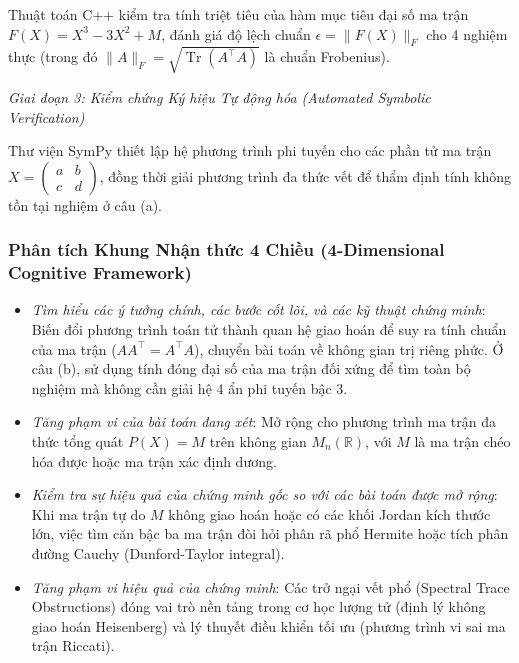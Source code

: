\documentclass{article}
\begin{document}
Thuật toán C++ kiểm tra tính triệt tiêu của hàm mục tiêu đại số ma trận $F(X) = X^3 - 3X^2 + M$, đánh giá độ lệch chuẩn $\epsilon = \|F(X)\|_F$ cho 4 nghiệm thực (trong đó $\|A\|_F = \sqrt{\operatorname{Tr}(A^\top A)}$ là chuẩn Frobenius).



\vspace{0.5em}\noindent\emph{Giai đoạn 3: Kiểm chứng Ký hiệu Tự động hóa (Automated Symbolic Verification)}

Thư viện \textsf{SymPy} thiết lập hệ phương trình phi tuyến cho các phần tử ma trận $X = \begin{pmatrix} a & b \\ c & d \end{pmatrix}$, đồng thời giải phương trình đa thức vết để thẩm định tính không tồn tại nghiệm ở câu (a).



\subsubsection*{Phân tích Khung Nhận thức 4 Chiều (4-Dimensional Cognitive Framework)}
\begin{itemize}
	\item \textit{Tìm hiểu các ý tưởng chính, các bước cốt lõi, và các kỹ thuật chứng minh}: Biến đổi phương trình toán tử thành quan hệ giao hoán để suy ra tính chuẩn của ma trận ($A A^\top = A^\top A$), chuyển bài toán về không gian trị riêng phức. Ở câu (b), sử dụng tính đóng đại số của ma trận đối xứng để tìm toàn bộ nghiệm mà không cần giải hệ 4 ẩn phi tuyến bậc 3.
	\item \textit{Tăng phạm vi của bài toán đang xét}: Mở rộng cho phương trình ma trận đa thức tổng quát $P(X) = M$ trên không gian $M_n(\mathbb{R})$, với $M$ là ma trận chéo hóa được hoặc ma trận xác định dương.
	\item \textit{Kiểm tra sự hiệu quả của chứng minh gốc so với các bài toán được mở rộng}: Khi ma trận tự do $M$ không giao hoán hoặc có các khối Jordan kích thước lớn, việc tìm căn bậc ba ma trận đòi hỏi phân rã phổ Hermite hoặc tích phân đường Cauchy (Dunford-Taylor integral).
	\item \textit{Tăng phạm vi hiệu quả của chứng minh}: Các trở ngại vết phổ (Spectral Trace Obstructions) đóng vai trò nền tảng trong cơ học lượng tử (định lý không giao hoán Heisenberg) và lý thuyết điều khiển tối ưu (phương trình vi sai ma trận Riccati).
\end{itemize}
\end{document}
